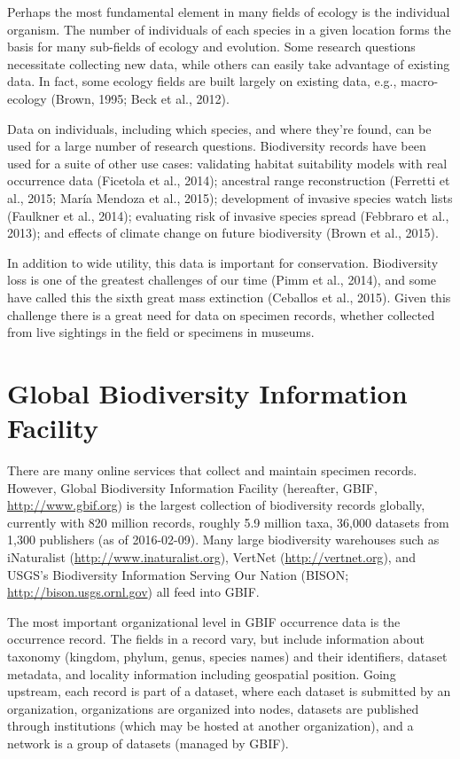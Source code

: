 \documentclass[author-year, review, 11pt]{components/elsarticle} %
\begin{document}
Perhaps the most fundamental element in many fields of ecology is the
individual organism. The number of individuals of each species in a
given location forms the basis for many sub-fields of ecology and
evolution. Some research questions necessitate collecting new data,
while others can easily take advantage of existing data. In fact, some
ecology fields are built largely on existing data, e.g., macro-ecology
(Brown, 1995; Beck et al., 2012).

Data on individuals, including which species, and where they're found,
can be used for a large number of research questions. Biodiversity
records have been used for a suite of other use cases: validating
habitat suitability models with real occurrence data (Ficetola et al.,
2014); ancestral range reconstruction (Ferretti et al., 2015; María
Mendoza et al., 2015); development of invasive species watch lists
(Faulkner et al., 2014); evaluating risk of invasive species spread
(Febbraro et al., 2013); and effects of climate change on future
biodiversity (Brown et al., 2015).

In addition to wide utility, this data is important for conservation.
Biodiversity loss is one of the greatest challenges of our time (Pimm et
al., 2014), and some have called this the sixth great mass extinction
(Ceballos et al., 2015). Given this challenge there is a great need for
data on specimen records, whether collected from live sightings in the
field or specimens in museums.

\section{Global Biodiversity Information
Facility}\label{global-biodiversity-information-facility}

There are many online services that collect and maintain specimen
records. However, Global Biodiversity Information Facility (hereafter,
GBIF, \url{http://www.gbif.org}) is the largest collection of
biodiversity records globally, currently with 820 million records,
roughly 5.9 million taxa, 36,000 datasets from 1,300 publishers (as of
2016-02-09). Many large biodiversity warehouses such as iNaturalist
(\url{http://www.inaturalist.org}), VertNet (\url{http://vertnet.org}),
and USGS's Biodiversity Information Serving Our Nation (BISON;
\url{http://bison.usgs.ornl.gov}) all feed into GBIF.

The most important organizational level in GBIF occurrence data is the
occurrence record. The fields in a record vary, but include information
about taxonomy (kingdom, phylum, genus, species names) and their
identifiers, dataset metadata, and locality information including
geospatial position. Going upstream, each record is part of a dataset,
where each dataset is submitted by an organization, organizations are
organized into nodes, datasets are published through institutions (which
may be hosted at another organization), and a network is a group of
datasets (managed by GBIF).
\end{document}
